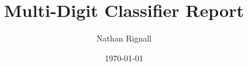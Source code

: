 \titlehead{\centering University of Hull}
\subject{662086 - Machine Learning}
\title{Multi-Digit Classifier Report}
\author{Nathan Rignall}
\date{\today}
\maketitle
